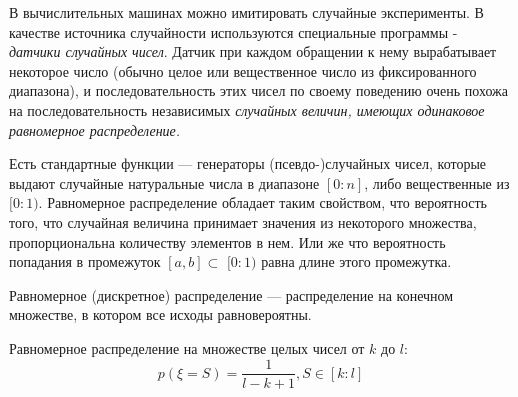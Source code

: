 В вычислительных машинах можно имитировать случайные эксперименты. 
В качестве источника случайности используются специальные программы - 
\textit{датчики случайных чисел}. Датчик при каждом обращении к нему вырабатывает 
некоторое число (обычно целое или вещественное число из фиксированного 
диапазона), и последовательность этих чисел по своему поведению очень 
похожа на последовательность независимых \textit{случайных величин, 
имеющих одинаковое равномерное распределение.}

Есть стандартные функции — генераторы (псевдо-)случайных чисел, 
которые выдают случайные натуральные числа в диапазоне $[0:n]$, либо 
вещественные из $[0:1)$. Равномерное распределение обладает таким
свойством, что вероятность того, что случайная величина принимает 
значения из некоторого множества, пропорциональна количеству 
элементов в нем. 
Или же что вероятность попадания в промежуток $[a,b] \subset$ $[0:1)$ 
равна длине этого промежутка.


\begin{definition}
    Равномерное (дискретное) распределение --- распределение на 
    конечном множестве, в котором все исходы равновероятны.
\end{definition}

\begin{eg}
    Равномерное распределение на множестве целых чисел от $k$ до $l:$ 
    $$p(\xi=S)=\frac{1}{l-k+1}, S \in [k:l]$$
\end{eg}

